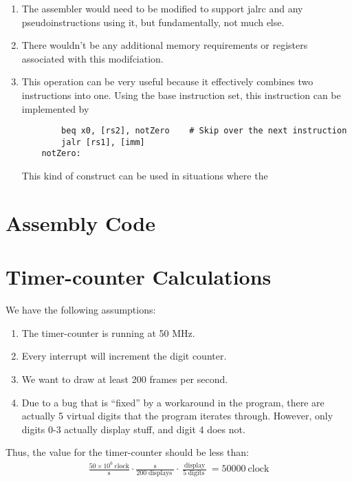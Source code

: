 \documentclass{article}
\DeclareMathOperator\ssdisplays{displays}
\DeclareMathOperator\ssdisplay{display}
\DeclareMathOperator\ssdigits{digits}
\begin{document}
\begin{enumerate}[label={\alph*.}]
    \item The assembler would need to be modified to support jalrc and any pseudoinstructions using it, but fundamentally, not much else.
    
    \item There wouldn't be any additional memory requirements or registers associated with this modifciation.

    \item This operation can be very useful because it effectively combines two instructions into one. Using the base instruction set, this instruction can be implemented by 
    \begin{verbatim}
        beq x0, [rs2], notZero    # Skip over the next instruction
        jalr [rs1], [imm]
    notZero:
    \end{verbatim}

    This kind of construct can be used in situations where the 

\end{enumerate}

\pagebreak

\section{Assembly Code}



\pagebreak

\section{Timer-counter Calculations}

We have the following assumptions:

\begin{enumerate}
    \item The timer-counter is running at 50 MHz.
    \item Every interrupt will increment the digit counter. 
    \item We want to draw at least 200 frames per second.
    \item Due to a bug that is ``fixed'' by a workaround in the program, there are actually 5 virtual digits that the program iterates through. However, only digits 0-3 actually display stuff, and digit 4 does not.
\end{enumerate}

Thus, the value for the timer-counter should be less than:
\begin{equation}
    \begin{aligned}
        \frac{50\times 10^6\ \text{clock}}{\si{\second}} \cdot \frac{\si{\second}}{200 \ssdisplays} \cdot \frac{\ssdisplay}{5 \ssdigits} = 50000\ \text{clock}
    \end{aligned}
\end{equation}
\end{document}
